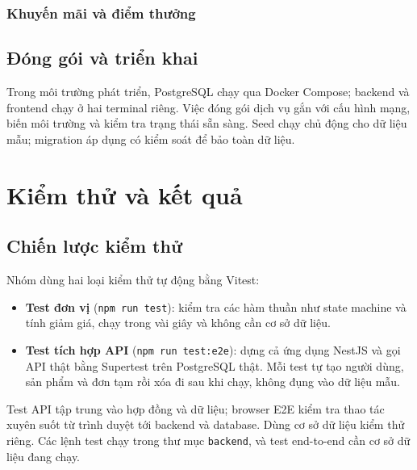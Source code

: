 \documentclass[a4paper]{article}
\begin{document}
\subsubsection{Khuyến mãi và điểm thưởng}






\subsection{Đóng gói và triển khai}
Trong môi trường phát triển, PostgreSQL chạy qua Docker Compose; backend và frontend chạy ở hai terminal riêng. Việc đóng gói dịch vụ gắn với cấu hình mạng, biến môi trường và kiểm tra trạng thái sẵn sàng. Seed chạy chủ động cho dữ liệu mẫu; migration áp dụng có kiểm soát để bảo toàn dữ liệu.

\newpage
\section{Kiểm thử và kết quả}
\subsection{Chiến lược kiểm thử}
Nhóm dùng hai loại kiểm thử tự động bằng Vitest:
\begin{itemize}
	\item \textbf{Test đơn vị} (\texttt{npm run test}): kiểm tra các hàm thuần như state machine và tính giảm giá, chạy trong vài giây và không cần cơ sở dữ liệu.
	\item \textbf{Test tích hợp API} (\texttt{npm run test:e2e}): dựng cả ứng dụng NestJS và gọi API thật bằng Supertest trên PostgreSQL thật. Mỗi test tự tạo người dùng, sản phẩm và đơn tạm rồi xóa đi sau khi chạy, không đụng vào dữ liệu mẫu.
\end{itemize}
Test API tập trung vào hợp đồng và dữ liệu; browser E2E kiểm tra thao tác xuyên suốt từ trình duyệt tới backend và database. Dùng cơ sở dữ liệu kiểm thử riêng. Các lệnh test chạy trong thư mục \texttt{backend}, và test end-to-end cần cơ sở dữ liệu đang chạy.
\end{document}
